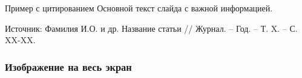 \documentclass[10pt]{beamer}  %
\begin{document}
\begin{frame}{Пример с цитированием}
    Основной текст слайда с важной информацией.
    
    \vspace{1em}
    
    \tiny Источник: Фамилия И.О. и др. Название статьи // Журнал. – Год. – Т. X. – С. XX-XX.
\end{frame}

\begin{frame}[plain]
    \frametitle{Изображение на весь экран}
\end{frame}
\end{document}
